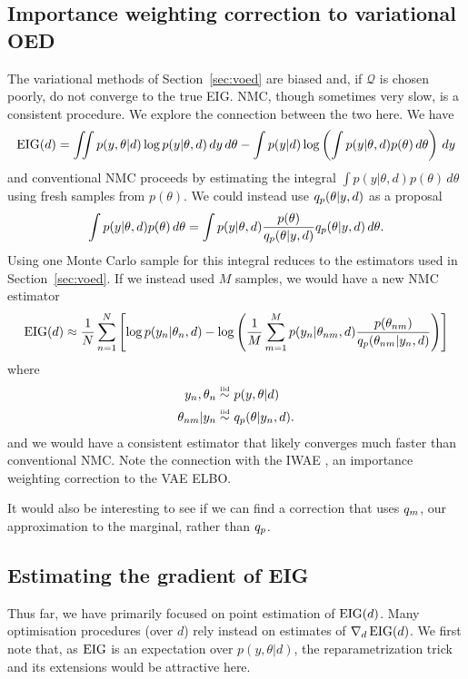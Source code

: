 \subsection{Importance weighting correction to variational OED}
The variational methods of Section~\ref{sec:voed} are biased and, if $\mathcal{Q}$ is chosen poorly, do not converge to the true EIG. NMC, though sometimes very slow, is a consistent procedure. We explore the connection between the two here. We have
\begin{equation}
	\text{EIG}(d) = \iint p(y, \theta | d) \log p(y|\theta, d) \, dy \, d\theta - \int p(y|d) \log \left( \int p(y|\theta,d) p(\theta) \, d\theta \right) \, dy
\end{equation}
and conventional NMC proceeds by estimating the integral $\int p(y|\theta,d) p(\theta) \, d\theta$ using fresh samples from $p(\theta)$. We could instead use $q_p(\theta|y,d)$ as a proposal
\begin{equation}
	\int p(y|\theta,d) p(\theta) \, d\theta = \int p(y|\theta,d) \frac{p(\theta)}{q_p(\theta|y,d)} q_p(\theta|y,d) \, d\theta.
\end{equation}
Using one Monte Carlo sample for this integral reduces to the estimators used in Section~\ref{sec:voed}. If we instead used $M$ samples, we would have a new NMC estimator
\begin{equation}
	\text{EIG}(d) \approx \frac{1}{N}\sum_{n=1}^N \left[ \log p(y_n | \theta_n, d) - \log \left(\frac{1}{M} \sum_{m=1}^M p(y_n | \theta_{nm}, d)\frac{p(\theta_{nm})}{q_p(\theta_{nm}|y_n,d)} \right) \right]
\end{equation}
where
\begin{align}
	y_n, \theta_n \overset{\text{\tiny iid}}{\sim} & \ p(y, \theta | d) \\
	\theta_{nm}|y_n \overset{\text{\tiny iid}}{\sim} & \ q_p(\theta|y_n,d).
\end{align}
and we would have a consistent estimator that likely converges much faster than conventional NMC. Note the connection with the IWAE \cite{iwae}, an importance weighting correction to the VAE ELBO.

It would also be interesting to see if we can find a correction that uses $q_m$, our approximation to the marginal, rather than $q_p$.


\subsection{Estimating the gradient of EIG}
Thus far, we have primarily focused on point estimation of $\text{EIG}(d)$. Many optimisation procedures (over $d$) rely instead on estimates of $\nabla_d\,\text{EIG}(d)$. We first note that, as $\text{EIG}$ is an expectation over $p(y,\theta|d)$, the reparametrization trick and its extensions \cite{tucker2017rebar, rezende2014stochastic} would be attractive here.

